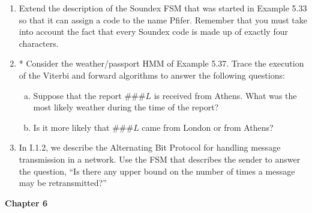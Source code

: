 \documentclass[10pt]{article}
\begin{document}
\begin{enumerate}[1)]

\item
Extend the description of the Soundex FSM that was started in Example 5.33 so that it can assign a code to the 
name Pfifer.  Remember that you must take into account the fact that every Soundex code is made up of exactly four 
characters.


\item
* Consider the weather/passport HMM of Example 5.37.  Trace the execution of the Viterbi and forward algorithms to answer the following questions:

\begin{enumerate}[a)]
\item
Suppose that the report $\#\#\#L$ is received from Athens.  What was the most likely weather during the time of the report?
 
\item
Is it more likely that $\#\#\#L$ came from London or from Athens?
\end{enumerate}


\addtocounter{enumi}{2}

\item
In I.1.2, we describe the Alternating Bit Protocol for handling message transmission in a network.  Use the FSM that describes the sender to answer the question, ``Is there any upper bound on the number of times a message may be retransmitted?''
\end{enumerate}

\textbf{Chapter 6}
\end{document}
